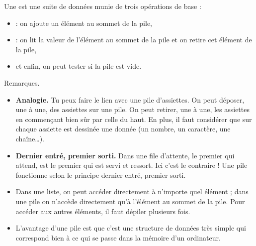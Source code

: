\documentclass[11pt,class=report,crop=false]{standalone}
\begin{document}
\newcommand{\badletter}[1]{\underline{\textcolor{red}{#1}}}









\begin{cours}[Pile]

  Une  est une suite de données munie de trois opérations de base :
  \begin{itemize}
    \item {} : on ajoute un élément au sommet de la pile,
    \item {} : on lit la valeur de l'élément au sommet de la pile et on retire cet élément de la pile,
    \item et enfin, on peut tester si la pile est vide.
  \end{itemize}  



Remarques.
\begin{itemize}
  \item \textbf{Analogie.} Tu peux faire le lien avec une pile d'assiettes. On peut déposer, une à une, des assiettes sur une pile. On peut retirer, une à une, les assiettes en commençant bien sûr par celle du haut. En plus, il faut considérer que sur chaque assiette est dessinée une donnée (un nombre, un caractère, une chaîne\ldots).

  \item \textbf{Dernier entré, premier sorti.} 
  Dans une file d'attente, le premier qui attend, est le premier qui est servi et ressort. Ici  c'est le contraire ! Une pile fonctionne selon le principe \og{}dernier entré, premier sorti\fg{}.
  
  \item Dans une liste, on peut accéder directement à n'importe quel élément ; dans une pile on n'accède directement  qu'à l'élément au sommet de la pile. Pour accéder aux autres éléments, il faut dépiler plusieurs fois.
  
  \item L'avantage d'une pile est que c'est une structure de données très simple qui correspond bien à ce qui se passe dans la mémoire d'un ordinateur.
\end{itemize}
\end{cours}
\end{document}
